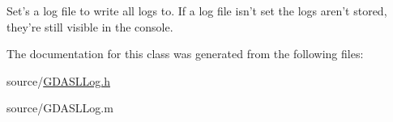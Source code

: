 Set's a log file to write all logs to. If a log file isn't set the logs aren't stored, they're still visible in the console. 

The documentation for this class was generated from the following files:\begin{DoxyCompactItemize}
\item 
source/\hyperlink{_g_d_a_s_l_log_8h}{GDASLLog.h}\item 
source/GDASLLog.m\end{DoxyCompactItemize}
